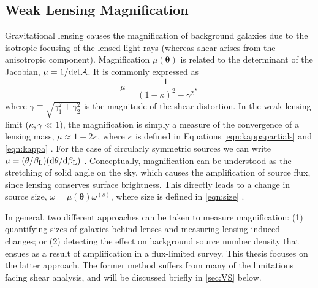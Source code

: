 
\subsection{Weak Lensing Magnification}
\label{sec:Mag}

Gravitational lensing causes the magnification of background galaxies due to the isotropic focusing of the lensed light rays (whereas shear arises from the anisotropic component). Magnification $\mu(\bm{\theta})$ is related to the determinant of the Jacobian, $\mu  = 1/{\rm det}{\cal A}$. It is commonly expressed as
\begin{equation}
\mu = \frac{1}{(1-\kappa)^2 - \gamma^2},
\end{equation}
where $\gamma \equiv \sqrt{\gamma_1^2 + \gamma_2^2}$ is the magnitude of the shear distortion. In the weak lensing limit ($\kappa, \gamma \ll 1$), the magnification is simply a measure of the convergence of a lensing mass, $\mu \approx 1+2\kappa$, where $\kappa$ is defined in Equations \ref{eqn:kappapartials} and \ref{eqn:kappa} \citep{Schneider06_IntroGravLensCosmology}. For the case of circularly symmetric sources we can write $\mu = (\theta/\beta_{\rm L})({\rm d}\theta/{\rm d}\beta_{\rm L})$
\citep{NarayanBartelmann96}. Conceptually, magnification can be understood as the stretching of solid angle on the sky, which causes the amplification of source flux, since lensing conserves surface brightness. This directly leads to a change in source size, $\omega = \mu(\bm{\theta}) \omega^{(s)}$, where size is defined in \autoref{eqn:size} \citep{BS01}.

In general, two different approaches can be taken to measure magnification: (1) quantifying sizes of galaxies behind lenses and measuring lensing-induced changes; or (2) detecting the effect on background source number density that ensues as a result of amplification in a flux-limited survey. This thesis focuses on the latter approach. The former method suffers from many of the limitations facing shear analysis, and will be discussed briefly in \autoref{sec:VS} below. 

